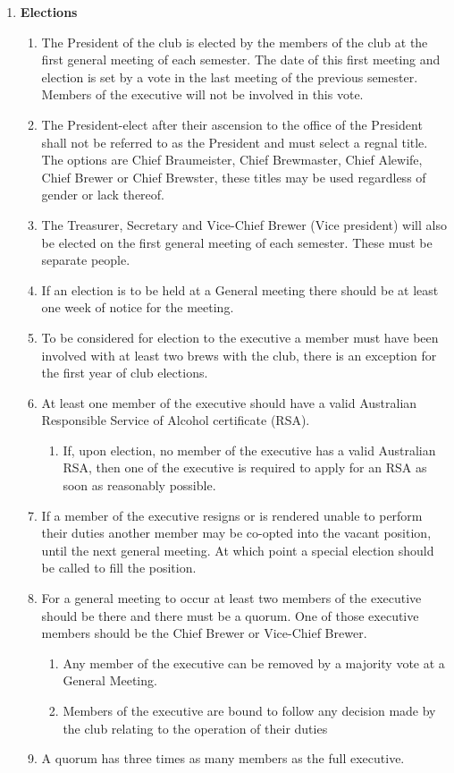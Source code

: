 \documentclass{article}
\begin{document}
\begin{enumerate}[label=\textbf{\arabic*}]
    \item \textbf{Elections}
    \begin{enumerate}[label=4.\arabic*]
        \item The President of the club is elected by the members of the club at the first general meeting of each semester. The date of this first meeting and election is set by a vote in the last meeting of the previous semester. Members of the executive will not be involved in this vote.
        \item The President-elect after their ascension to the office of the President shall not be referred to as the President and must select a regnal title. The options are Chief Braumeister, Chief Brewmaster, Chief Alewife, Chief Brewer or Chief Brewster, these titles may be used regardless of gender or lack thereof.
        \item The Treasurer, Secretary and Vice-Chief Brewer (Vice president) will also be elected on the first general meeting of each semester. These must be separate people.
        \item If an election is to be held at a General meeting there should be at least one week of notice for the meeting.
        \item To be considered for election to the executive a member must have been involved with at least two brews with the club, there is an exception for the first year of club elections.
        \item At least one member of the executive should have a valid Australian Responsible Service of Alcohol certificate (RSA).
        \begin{enumerate}[label=4.6.\arabic*]
            \item If, upon election, no member of the executive has a valid Australian RSA, then one of the executive is required to apply for an RSA as soon as reasonably possible.
        \end{enumerate}
        \item If a member of the executive resigns or is rendered unable to perform their duties another member may be co-opted into the vacant position, until the next general meeting. At which point a special election should be called to fill the position.
        \item For a general meeting to occur at least two members of the executive should be there and there must be a quorum. One of those executive members should be the Chief Brewer or Vice-Chief Brewer.
        \begin{enumerate}[label=\alph*.]
            \item Any member of the executive can be removed by a majority vote at a General Meeting.
            \item Members of the executive are bound to follow any decision made by the club relating to the operation of their duties
        \end{enumerate}
        \item A quorum has three times as many members as the full executive.
    \end{enumerate}


\end{enumerate}
\end{document}
